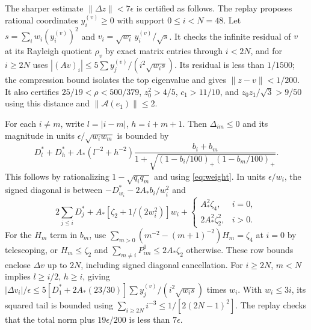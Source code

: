 \documentclass[11pt]{article}
\begin{document}
The sharper estimate $\|\Delta z\|<7\epsilon$ is certified as follows. The replay proposes rational coordinates $y_i^{(v)}\ge0$ with support $0\le i<N=48$. Let $s=\sum_i w_i(y_i^{(v)})^2$ and $v_i=\sqrt{w_i}\,y_i^{(v)}/\sqrt{s}$. It checks the infinite residual of $v$ at its Rayleigh quotient $\rho_v$ by exact matrix entries through $i<2N$, and for $i\ge2N$ uses $|(Av)_i|\le5\sum y_j^{(v)}/(i^2\sqrt{w_i s})$. Its residual is less than $1/1500$; the compression bound isolates the top eigenvalue and gives $\|z-v\|<1/200$. It also certifies $25/19<\rho<500/379$, $z_0^2>4/5$, $c_1>11/10$, and $z_0z_1/\sqrt3>9/50$ using this distance and $\|\mathcal A(e_1)\|\le2$.

For each $i\ne m$, write $l=|i-m|$, $h=i+m+1$. Then $\Delta_{im}\le0$ and its magnitude in units $\epsilon/\sqrt{w_iw_m}$ is bounded by
\[
 D_l^*+D_h^*+A_*(l^{-2}+h^{-2})\frac{b_i+b_m}{1+\sqrt{(1-b_i/100)_+(1-b_m/100)_+}}.
\]
This follows by rationalizing $1-\sqrt{q_iq_m}$ and using \eqref{eq:weight}. In units $\epsilon/w_i$, the signed diagonal is between $-D_{w_i}^*-2A_*b_i/w_i^2$ and
\[
 2\sum_{j\le i}D_j^*+A_*[\zeta_2+1/(2w_i^2)]w_i+
 \begin{cases}A_*^2\zeta_4,&i=0,\\2A_*^2\zeta_2^2,&i>0.\end{cases}
\]
For the $H_m$ term in $b_m$, use $\sum_{m>0}(m^{-2}-(m+1)^{-2})H_m=\zeta_4$ at $i=0$ by telescoping, or $H_m\le\zeta_2$ and $\sum_{m\ne i}P^0_{im}\le2A_*\zeta_2$ otherwise. These row bounds enclose $\Delta v$ up to $2N$, including signed diagonal cancellation. For $i\ge2N$, $m<N$ implies $l\ge i/2$, $h\ge i$, giving $|\Delta v_i|/\epsilon\le5[D_1^*+2A_*(23/30)]\sum y_j^{(v)}/(i^2\sqrt{w_i s})$ times $w_i$. With $w_i\le3i$, its squared tail is bounded using $\sum_{i\ge2N}i^{-3}\le1/[2(2N-1)^2]$. The replay checks that the total norm plus $19\epsilon/200$ is less than $7\epsilon$.
\end{document}
